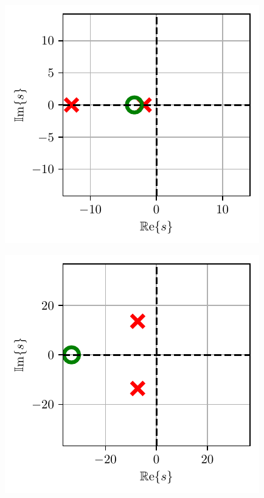 \documentclass[a4paper, 12pt, diplomski]{etf}
\begin{document}
\begin{center}
\begin{minipage}{0.45\textwidth}
\centering
\includegraphics[scale=1]{fig_zplane/BezPreskok.pdf}
\label{zplane1}
\end{minipage}\hfill
\begin{minipage}{0.45\textwidth}
\includegraphics[scale=1]{fig_zplane/Preskok.pdf} 
\label{zplane2} 
\end{minipage}
\end{center}
\end{document}
